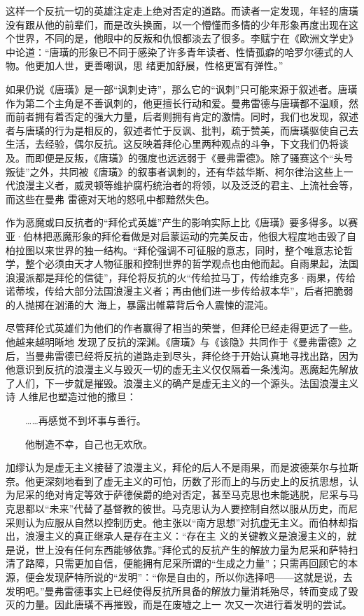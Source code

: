 \documentclass{article}
\begin{document}
这样一个反抗一切的英雄注定走上绝对否定的道路。而读者一定发现，年轻的唐璜没有跟从他的前辈们，而是改头换面，以一个懵懂而多情的少年形象再度出现在这个世界，不同的是，他眼中的反叛和仇恨都淡去了很多。李赋宁在《欧洲文学史》中论道：“唐璜的形象已不同于感染了许多青年读者、性情孤癖的哈罗尔德式的人物。他更加人世，更善嘲讽，思
绪更加舒展，性格更富有弹性。” 

如果仍说《唐璜》是一部“讽刺史诗”，那么它的“讽刺”只可能来源于叙述者。唐璜作为第二个主角是不善讽刺的，他更擅长行动和爱。曼弗雷德与唐璜都不温顺，然而前者拥有着否定的强大力量，后者则拥有肯定的激情。同时，我们也发现，叙述者与唐璜的行为是相反的，叙述者忙于反讽、批判，疏于赞美，而唐璜驱使自己去生活，去经验，偶尔反抗。这反映着拜伦心里两种观点的斗争，下文我们仍将谈
\newpage
及。而即便是反叛，《唐璜》的强度也远远弱于《曼弗雷德》。除了骚赛这个“头号叛徒”之外，共同被《唐璜》的叙事者讽刺的，还有华兹华斯、柯尔律治这些上一代浪漫主义者，威灵顿等维护腐朽统治者的将领，以及泛泛的君主、上流社会等，而这些在曼弗
雷德对天地的怒吼中都黯然失色。 

作为恶魔或曰反抗者的“拜伦式英雄”产生的影响实际上比《唐璜》要多得多。以赛亚·伯林把恶魔形象的拜伦看做是对启蒙运动的完美反击，他很大程度地击毁了自柏拉图以来世界的独一结构。“拜伦强调不可征服的意志，同时，整个唯意志论哲学，整个必须由天才人物征服和控制世界的哲学观点也由他而起。自雨果起，法国浪漫派都是拜伦的信徒”，拜伦将反抗的火“传给拉马丁，传给维克多·雨果，传给诺蒂埃，传给大部分法国浪漫主义者；再由他们进一步传给叔本华”，后者把脆弱的人抛掷在汹涌的大
海上，暴露出帷幕背后令人震悚的混沌。 

尽管拜伦式英雄们为他们的作者赢得了相当的荣誉，但拜伦已经走得更远了一些。他越来越明晰地
\newpage
发现了反抗的深渊。《唐璜》与《该隐》共同作于《曼弗雷德》之后，当曼弗雷德已经将反抗的道路走到尽头，拜伦终于开始认真地寻找出路，因为他意识到反抗的浪漫主义与毁灭一切的虚无主义仅仅隔着一条浅沟。恶魔起先解放了人们，下一步就是摧毁。浪漫主义的确产是虚无主义的一个源头。法国浪漫主义诗
人维尼也塑造过他的撒旦： 


　　……再感觉不到坏事与善行。 


　　他制造不幸，自己也无欢欣。 

加缪认为是虚无主义接替了浪漫主义，拜伦的后人不是雨果，而是波德莱尔与拉斯奈。他更深刻地看到了虚无主义的可怕，历数了形而上的与历史上的反抗思想，认为尼采的绝对肯定等效于萨德侯爵的绝对否定，甚至马克思也未能逃脱，尼采与马克思都以“未来”代替了基督教的彼世。马克思认为人要控制自然以服从历史，而尼采则认为应服从自然以控制历史。他主张以“南方思想”对抗虚无主义。而伯林却指出，浪漫主义的真正继承人是存在主义：“存在主
\newpage
义的关键教义是浪漫主义的，就是说，世上没有任何东西能够依靠。”拜伦式的反抗产生的解放力量为尼采和萨特扫清了路障，只需更加自信，便能拥有尼采所谓的“生成之力量”；只需再回顾它的本源，便会发现萨特所说的“发明”：“你是自由的，所以你选择吧——这就是说，去发明吧。”曼弗雷德事实上已经使得反抗所具备的解放力量消耗殆尽，转而变成了毁灭的力量。因此唐璜不再摧毁，而是在废墟之上一
次又一次进行着发明的尝试。 
\end{document}
